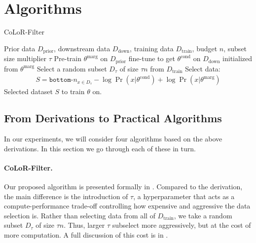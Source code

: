 \documentclass{article}
\newcommand{\Dprior}{D_{\text{prior}}}
\newcommand{\Ddown}{D_{\text{down}}}
\newcommand{\Dcandidate}{D_{\text{candidate}}}
\newcommand{\Dtrain}{D_{\text{train}}}
\newcommand{\thetacond}{\theta^{\text{cond}}}
\newcommand{\thetamarg}{\theta^{\text{marg}}}
\begin{document}


\section{Algorithms}\label{sec:algs}

\begin{algorithm}[h]
\caption{CoLoR-Filter}
\begin{algorithmic}[1]
\label{alg:color-filter}
  \REQUIRE Prior data $ \Dprior$, downstream data $ \Ddown$, training data $ \Dtrain$, budget $ n$,  subset size multiplier $ \tau$
  \STATE Pre-train $ \thetamarg$ on $ \Dprior$
  \STATE fine-tune to get $ \thetacond$ on $ \Ddown$ initialized from $ \thetamarg$
  \STATE Select a random subset $ D_\tau$ of size $ \tau n$ from $ \Dtrain$
  \STATE Select data:
  \vspace{-0.4cm}
  \begin{align*}
        S =  \texttt{bottom-}n_{x \in D_\tau}  -\log \Pr(x| \thetacond) + \log \Pr(x| \thetamarg)
    \end{align*}
    \vspace{-0.5cm}
  \RETURN Selected dataset $S$ to train $ \theta$ on.
\end{algorithmic}
\end{algorithm}



\subsection{From Derivations to Practical Algorithms}

In our experiments, we will consider four algorithms based on the above derivations. In this section we go through each of these in turn.

\paragraph{CoLoR-Filter.} Our proposed algorithm is presented formally in . Compared to the derivation, the main difference is the introduction of $ \tau$, a hyperparameter that acts as a compute-performance trade-off controlling how expensive and aggressive the data selection is. Rather than selecting data from all of $ \Dtrain$, we take a random subset $ D_\tau$ of size $ \tau n$. Thus, larger $\tau $ subselect more aggressively, but at the cost of more computation. A full discussion of this cost is in .
\end{document}

